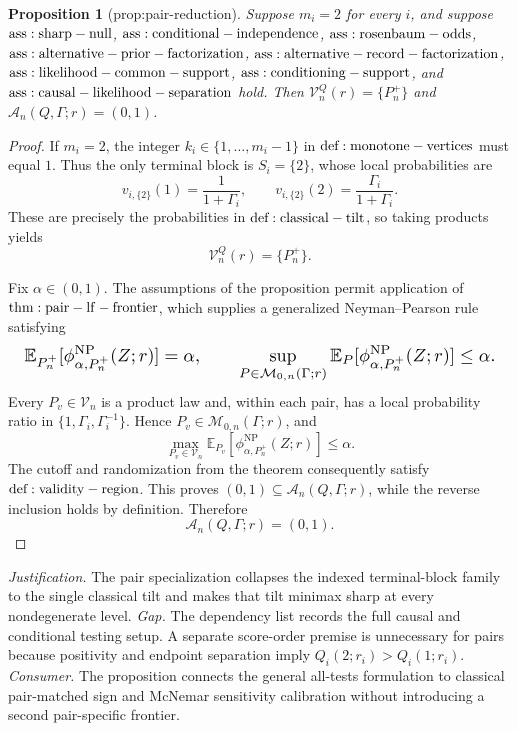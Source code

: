 \documentclass{article}
\newtheorem{proposition}{Proposition}
\begin{document}
\begin{proposition}[prop:pair-reduction]\label{prop:pair-reduction}
Suppose \(m_i=2\) for every \(i\), and suppose \({\rm ass:sharp-null}\), \({\rm ass:conditional-independence}\), \({\rm ass:rosenbaum-odds}\), \({\rm ass:alternative-prior-factorization}\), \({\rm ass:alternative-record-factorization}\), \({\rm ass:likelihood-common-support}\), \({\rm ass:conditioning-support}\), and \({\rm ass:causal-likelihood-separation}\) hold. Then \(\mathcal V_n^Q(r)=\{P_n^+\}\) and \(\mathcal A_n(Q,\Gamma;r)=(0,1)\).
\end{proposition}
\begin{proof}
If \(m_i=2\), the integer \(k_i\in\{1,\ldots,m_i-1\}\) in \({\rm def:monotone-vertices}\) must equal \(1\). Thus the only terminal block is \(S_i=\{2\}\), whose local probabilities are
\[
 v_{i,\{2\}}(1)=\frac1{1+\Gamma_i},\qquad v_{i,\{2\}}(2)=\frac{\Gamma_i}{1+\Gamma_i}.
\]
These are precisely the probabilities in \({\rm def:classical-tilt}\), so taking products yields
\[
 \mathcal V_n^Q(r)=\{P_n^+\}.
\]

Fix \(\alpha\in(0,1)\). The assumptions of the proposition permit application of \({\rm thm:pair-lf-frontier}\), which supplies a generalized Neyman--Pearson rule satisfying
\[
\makebox[\linewidth][c]{\resizebox{0.98\linewidth}{!}{\(\displaystyle \mathbb E_{P_n^+}[\phi_{\alpha,P_n^+}^{\mathrm{NP}}(Z;r)]=\alpha,
 \qquad
 \sup_{P\in\mathcal M_{0,n}(\Gamma;r)}\mathbb E_P[\phi_{\alpha,P_n^+}^{\mathrm{NP}}(Z;r)]\leq\alpha.\)}}
\]
Every \(P_v\in\mathcal V_n\) is a product law and, within each pair, has a local probability ratio in \(\{1,\Gamma_i,\Gamma_i^{-1}\}\). Hence \(P_v\in\mathcal M_{0,n}(\Gamma;r)\), and
\[
 \max_{P_v\in\mathcal V_n}\mathbb E_{P_v}[\phi_{\alpha,P_n^+}^{\mathrm{NP}}(Z;r)]\leq\alpha.
\]
The cutoff and randomization from the theorem consequently satisfy \({\rm def:validity-region}\). This proves \((0,1)\subseteq\mathcal A_n(Q,\Gamma;r)\), while the reverse inclusion holds by definition. Therefore
\[
 \mathcal A_n(Q,\Gamma;r)=(0,1).
\]
\end{proof}
\par\smallskip\noindent \textit{Justification.} The pair specialization collapses the indexed terminal-block family to the single classical tilt and makes that tilt minimax sharp at every nondegenerate level. \textit{Gap.} The dependency list records the full causal and conditional testing setup. A separate score-order premise is unnecessary for pairs because positivity and endpoint separation imply \(Q_i(2;r_i)>Q_i(1;r_i)\). \textit{Consumer.} The proposition connects the general all-tests formulation to classical pair-matched sign and McNemar sensitivity calibration without introducing a second pair-specific frontier.
\end{document}
